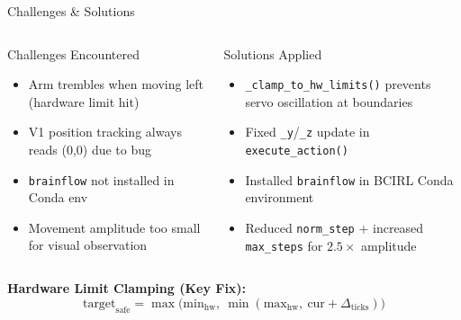 \documentclass[aspectratio=169, 11pt]{beamer}
\begin{document}
\begin{frame}{Challenges \& Solutions}
    \begin{columns}[T]
        \begin{alertblock}{Challenges Encountered}
            \begin{itemize}
                \item Arm trembles when moving left (hardware limit hit)
                \item V1 position tracking always reads (0,0) due to bug
                \item \texttt{brainflow} not installed in Conda env
                \item Movement amplitude too small for visual observation
            \end{itemize}
        \end{alertblock}
        
        \begin{exampleblock}{Solutions Applied}
            \begin{itemize}
                \item \texttt{\_clamp\_to\_hw\_limits()} prevents servo oscillation at boundaries
                \item Fixed \texttt{\_y}/\texttt{\_z} update in \texttt{execute\_action()}
                \item Installed \texttt{brainflow} in BCIRL Conda environment
                \item Reduced \texttt{norm\_step} + increased \texttt{max\_steps} for $2.5\times$ amplitude
            \end{itemize}
        \end{exampleblock}
    \end{columns}
    
    \vspace{3mm}
    \textbf{Hardware Limit Clamping (Key Fix):}
    \begin{equation*}
        \text{target}_{\text{safe}} = \max\!\big(\text{min}_{\text{hw}},\ \min(\text{max}_{\text{hw}},\ \text{cur} + \Delta_{\text{ticks}})\big)
    \end{equation*}
\end{frame}
\end{document}
